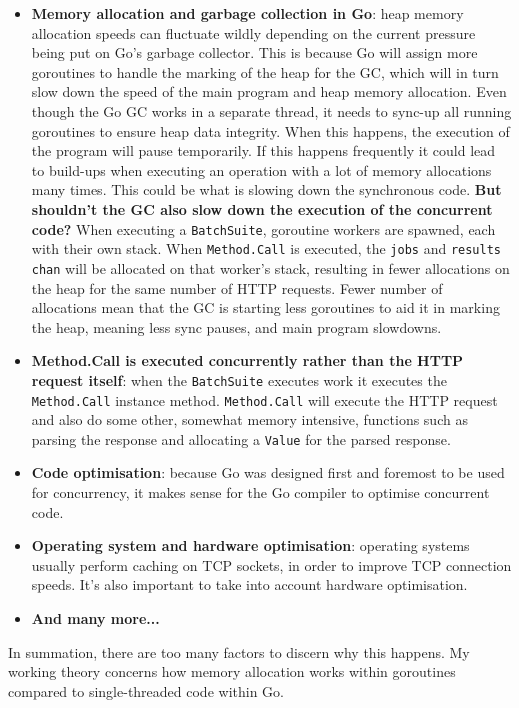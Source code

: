 \begin{itemize}
    \item \textbf{Memory allocation and garbage collection in Go}: heap memory allocation speeds can fluctuate wildly depending on the current pressure being put on Go's garbage collector. This is because Go will assign more goroutines to handle the marking of the heap for the GC, which will in turn slow down the speed of the main program and heap memory allocation. Even though the Go GC works in a separate thread, it needs to sync-up all running goroutines to ensure heap data integrity. When this happens, the execution of the program will pause temporarily. If this happens frequently it could lead to build-ups when executing an operation with a lot of memory allocations many times. This could be what is slowing down the synchronous code. \textbf{But shouldn't the GC also slow down the execution of the concurrent code?} When executing a \verb|BatchSuite|, goroutine workers are spawned, each with their own stack. When \verb|Method.Call| is executed, the \verb|jobs| and \verb|results| \texttt{chan} will be allocated on that worker's stack, resulting in fewer allocations on the heap for the same number of HTTP requests. Fewer number of allocations mean that the GC is starting less goroutines to aid it in marking the heap, meaning less sync pauses, and main program slowdowns.
    \item \textbf{Method.Call is executed concurrently rather than the HTTP request itself}: when the \verb|BatchSuite| executes work it executes the \verb|Method.Call| instance method. \verb|Method.Call| will execute the HTTP request and also do some other, somewhat memory intensive, functions such as parsing the response and allocating a \verb|Value| for the parsed response.
    \item \textbf{Code optimisation}: because Go was designed first and foremost to be used for concurrency, it makes sense for the Go compiler to optimise concurrent code.
    \item \textbf{Operating system and hardware optimisation}: operating systems usually perform caching on TCP sockets, in order to improve TCP connection speeds. It's also important to take into account hardware optimisation.
    \item \textbf{And many more...}
\end{itemize}

In summation, there are too many factors to discern why this happens. My working theory concerns how memory allocation works within goroutines compared to single-threaded code within Go.
